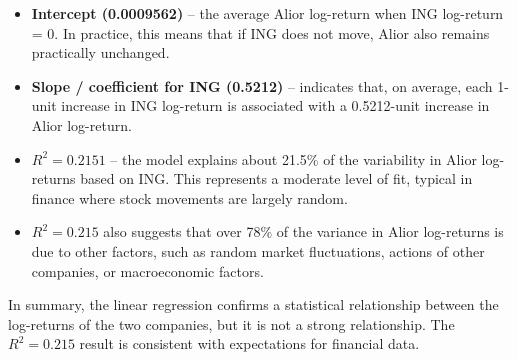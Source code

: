 \documentclass[
]{article}
\begin{document}
\begin{itemize}
\item
  \textbf{Intercept (0.0009562)} -- the average Alior log-return when
  ING log-return = 0. In practice, this means that if ING does not move,
  Alior also remains practically unchanged.
\item
  \textbf{Slope / coefficient for ING (0.5212)} -- indicates that, on
  average, each 1-unit increase in ING log-return is associated with a
  0.5212-unit increase in Alior log-return.
\item
  \textbf{\(R^2 = 0.2151\)} -- the model explains about 21.5\% of the
  variability in Alior log-returns based on ING. This represents a
  moderate level of fit, typical in finance where stock movements are
  largely random.
\item
  \(R^2 = 0.215\) also suggests that over 78\% of the variance in Alior
  log-returns is due to other factors, such as random market
  fluctuations, actions of other companies, or macroeconomic factors.
\end{itemize}

In summary, the linear regression confirms a statistical relationship
between the log-returns of the two companies, but it is not a strong
relationship. The \(R^2 = 0.215\) result is consistent with expectations
for financial data.
\end{document}
